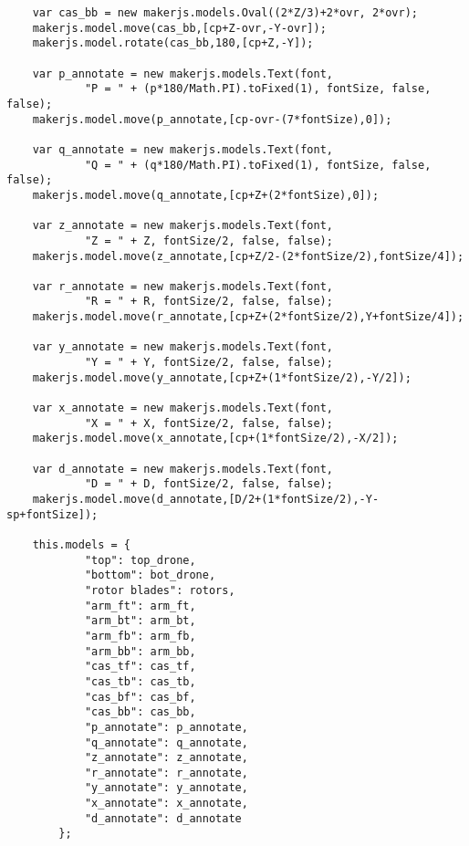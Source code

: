 \documentclass[11pt]{article}
\begin{document}
\begin{lstlisting}
    var cas_bb = new makerjs.models.Oval((2*Z/3)+2*ovr, 2*ovr);
    makerjs.model.move(cas_bb,[cp+Z-ovr,-Y-ovr]);
    makerjs.model.rotate(cas_bb,180,[cp+Z,-Y]);
                                          
    var p_annotate = new makerjs.models.Text(font,
            "P = " + (p*180/Math.PI).toFixed(1), fontSize, false, false);
    makerjs.model.move(p_annotate,[cp-ovr-(7*fontSize),0]);
                      
    var q_annotate = new makerjs.models.Text(font,
            "Q = " + (q*180/Math.PI).toFixed(1), fontSize, false, false);
    makerjs.model.move(q_annotate,[cp+Z+(2*fontSize),0]);
                      
    var z_annotate = new makerjs.models.Text(font,
            "Z = " + Z, fontSize/2, false, false);
    makerjs.model.move(z_annotate,[cp+Z/2-(2*fontSize/2),fontSize/4]);
            
    var r_annotate = new makerjs.models.Text(font,
            "R = " + R, fontSize/2, false, false);
    makerjs.model.move(r_annotate,[cp+Z+(2*fontSize/2),Y+fontSize/4]);
                                   
    var y_annotate = new makerjs.models.Text(font,
            "Y = " + Y, fontSize/2, false, false);
    makerjs.model.move(y_annotate,[cp+Z+(1*fontSize/2),-Y/2]);
                                         
    var x_annotate = new makerjs.models.Text(font,
            "X = " + X, fontSize/2, false, false);
    makerjs.model.move(x_annotate,[cp+(1*fontSize/2),-X/2]);
                                   
    var d_annotate = new makerjs.models.Text(font,
            "D = " + D, fontSize/2, false, false);
    makerjs.model.move(d_annotate,[D/2+(1*fontSize/2),-Y-sp+fontSize]);
            
    this.models = {
            "top": top_drone,
            "bottom": bot_drone,
            "rotor blades": rotors,
            "arm_ft": arm_ft,
            "arm_bt": arm_bt,
            "arm_fb": arm_fb,
            "arm_bb": arm_bb,
            "cas_tf": cas_tf,
            "cas_tb": cas_tb,
            "cas_bf": cas_bf,
            "cas_bb": cas_bb,
            "p_annotate": p_annotate,
            "q_annotate": q_annotate,
            "z_annotate": z_annotate,
            "r_annotate": r_annotate,
            "y_annotate": y_annotate,
            "x_annotate": x_annotate,
            "d_annotate": d_annotate
        };


\end{lstlisting}
\end{document}
